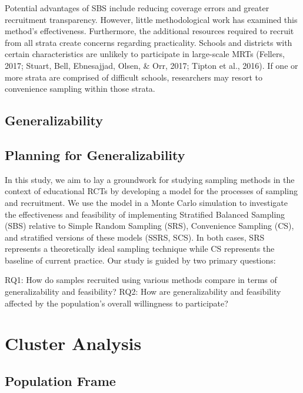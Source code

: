 \documentclass[,man]{apa6}
\theoremstyle{definition}
\theoremstyle{definition}
\theoremstyle{definition}
\theoremstyle{remark}
\begin{document}
Potential advantages of SBS include reducing coverage errors and greater
recruitment transparency. However, little methodological work has
examined this method's effectiveness. Furthermore, the additional
resources required to recruit from all strata create concerns regarding
practicality. Schools and districts with certain characteristics are
unlikely to participate in large-scale MRTs (Fellers, 2017; Stuart,
Bell, Ebnesajjad, Olsen, \& Orr, 2017; Tipton et al., 2016). If one or
more strata are comprised of difficult schools, researchers may resort
to convenience sampling within those strata.

\hypertarget{generalizability}{%
\subsection{Generalizability}\label{generalizability}}

\hypertarget{planning-for-generalizability}{%
\subsection{Planning for
Generalizability}\label{planning-for-generalizability}}

In this study, we aim to lay a groundwork for studying sampling methods
in the context of educational RCTs by developing a model for the
processes of sampling and recruitment. We use the model in a Monte Carlo
simulation to investigate the effectiveness and feasibility of
implementing Stratified Balanced Sampling (SBS) relative to Simple
Random Sampling (SRS), Convenience Sampling (CS), and stratified
versions of these models (SSRS, SCS). In both cases, SRS represents a
theoretically ideal sampling technique while CS represents the baseline
of current practice. Our study is guided by two primary questions:

RQ1: How do samples recruited using various methods compare in terms of
generalizability and feasibility? RQ2: How are generalizability and
feasibility affected by the population's overall willingness to
participate?

\hypertarget{cluster-analysis}{%
\section{Cluster Analysis}\label{cluster-analysis}}

\hypertarget{population-frame}{%
\subsection{Population Frame}\label{population-frame}}
\end{document}
